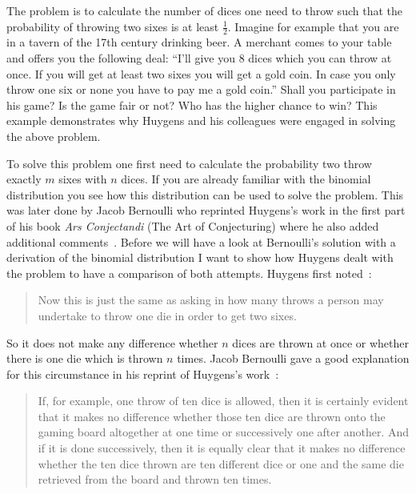 The problem is to calculate the number of dices one need to throw such that the probability of throwing two sixes is at least $\tfrac 12$. Imagine for example that you are in a tavern of the 17th century drinking beer. A merchant comes to your table and offers you the following deal: ``I'll give you $8$ dices which you can throw at once. If you will get at least two sixes you will get a gold coin. In case you only throw one six or none you have to pay me a gold coin.'' Shall you participate in his game? Is the game fair or not? Who has the higher chance to win? This example demonstrates why Huygens and his colleagues were engaged in solving the above problem. 


To solve this problem one first need to calculate the probability two throw exactly $m$ sixes with $n$ dices. If you are already familiar with the binomial distribution you see how this distribution can be used to solve the problem. This was later done by Jacob Bernoulli who reprinted Huygens's work  in the first part of his book \emph{Ars Conjectandi} (The Art of Conjecturing) where he also added additional comments~\cite[p. 63]{bernoulli}. Before we will have a look at Bernoulli's solution with a derivation of the binomial distribution I want to show how Huygens dealt with the problem to have a comparison of both attempts. Huygens first noted~\cite[p. 163]{bernoulli}:

\begin{quotation}
  Now this is just the same as asking in how many throws a person may undertake to throw one die in order to get two sixes.
\end{quotation}

So it does not make any difference whether $n$ dices are thrown at once or whether there is one die which is thrown $n$ times. Jacob Bernoulli gave a good explanation for this circumstance in his reprint of Huygens's work~\cite[p. 163]{bernoulli}:

\begin{quotation}
  If, for example, one throw of ten dice is allowed, then it is certainly evident that it makes no difference whether those ten dice are thrown onto the gaming board altogether at one time or successively one after another. And if it is done successively, then it is equally clear that it makes no difference whether the ten dice thrown are ten different dice or one and the same die retrieved from the board and thrown ten times.
\end{quotation}

